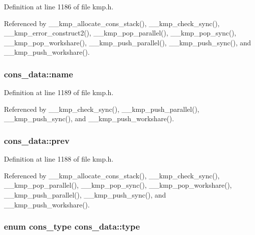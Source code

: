 Definition at line 1186 of file kmp.\-h.



Referenced by \-\_\-\-\_\-kmp\-\_\-allocate\-\_\-cons\-\_\-stack(), \-\_\-\-\_\-kmp\-\_\-check\-\_\-sync(), \-\_\-\-\_\-kmp\-\_\-error\-\_\-construct2(), \-\_\-\-\_\-kmp\-\_\-pop\-\_\-parallel(), \-\_\-\-\_\-kmp\-\_\-pop\-\_\-sync(), \-\_\-\-\_\-kmp\-\_\-pop\-\_\-workshare(), \-\_\-\-\_\-kmp\-\_\-push\-\_\-parallel(), \-\_\-\-\_\-kmp\-\_\-push\-\_\-sync(), and \-\_\-\-\_\-kmp\-\_\-push\-\_\-workshare().

\hypertarget{structcons__data_a2505ac1ca9e905c68f9770d7bfc41214}{
\subsubsection[{name}]{ cons\-\_\-data\-::name}}\label{structcons__data_a2505ac1ca9e905c68f9770d7bfc41214}


Definition at line 1189 of file kmp.\-h.



Referenced by \-\_\-\-\_\-kmp\-\_\-check\-\_\-sync(), \-\_\-\-\_\-kmp\-\_\-push\-\_\-parallel(), \-\_\-\-\_\-kmp\-\_\-push\-\_\-sync(), and \-\_\-\-\_\-kmp\-\_\-push\-\_\-workshare().

\hypertarget{structcons__data_ac25aa2afe905faf60427d1590f7795eb}{
\subsubsection[{prev}]{ cons\-\_\-data\-::prev}}\label{structcons__data_ac25aa2afe905faf60427d1590f7795eb}


Definition at line 1188 of file kmp.\-h.



Referenced by \-\_\-\-\_\-kmp\-\_\-allocate\-\_\-cons\-\_\-stack(), \-\_\-\-\_\-kmp\-\_\-check\-\_\-sync(), \-\_\-\-\_\-kmp\-\_\-pop\-\_\-parallel(), \-\_\-\-\_\-kmp\-\_\-pop\-\_\-sync(), \-\_\-\-\_\-kmp\-\_\-pop\-\_\-workshare(), \-\_\-\-\_\-kmp\-\_\-push\-\_\-parallel(), \-\_\-\-\_\-kmp\-\_\-push\-\_\-sync(), and \-\_\-\-\_\-kmp\-\_\-push\-\_\-workshare().

\hypertarget{structcons__data_a6e32717dd06d661e44e920a0b2d35db3}{
\subsubsection[{type}]{\setlength{\rightskip}{0pt plus 5cm}enum {\bf cons\-\_\-type} cons\-\_\-data\-::type}}\label{structcons__data_a6e32717dd06d661e44e920a0b2d35db3}


